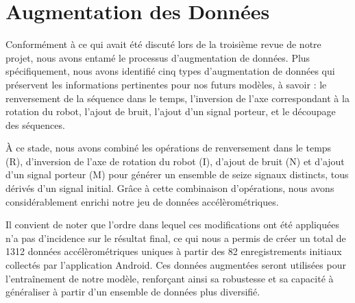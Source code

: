 \newpage
\section{Augmentation des Données}

 Conformément à ce qui avait été discuté lors de la troisième revue de notre projet, nous avons entamé le processus d'augmentation de données. Plus spécifiquement, nous avons identifié cinq types d'augmentation de données qui préservent les informations pertinentes pour nos futurs modèles, à savoir : le renversement de la séquence dans le temps, l'inversion de l'axe correspondant à la rotation du robot, l'ajout de bruit, l'ajout d'un signal porteur, et le découpage des séquences.

À ce stade, nous avons combiné les opérations de renversement dans le temps (R), d'inversion de l'axe de rotation du robot (I), d'ajout de bruit (N) et d'ajout d'un signal porteur (M) pour générer un ensemble de seize signaux distincts, tous dérivés d'un signal initial. Grâce à cette combinaison d'opérations, nous avons considérablement enrichi notre jeu de données accélèrométriques.

Il convient de noter que l'ordre dans lequel ces modifications ont été appliquées n'a pas d'incidence sur le résultat final, ce qui nous a permis de créer un total de 1312 données accélèrométriques uniques à partir des 82 enregistrements initiaux collectés par l'application Android. Ces données augmentées seront utilisées pour l'entraînement de notre modèle, renforçant ainsi sa robustesse et sa capacité à généraliser à partir d'un ensemble de données plus diversifié.